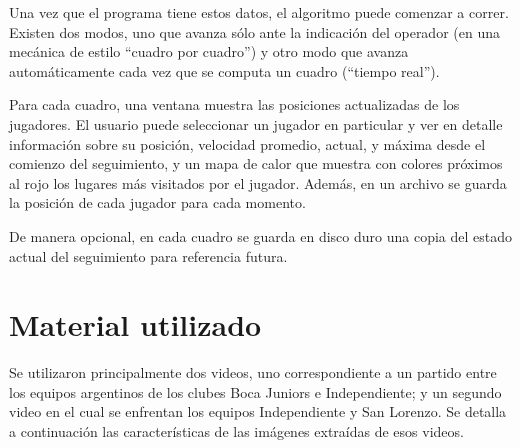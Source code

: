 Una vez que el programa tiene estos datos, el algoritmo puede comenzar a
correr. Existen dos modos, uno que avanza sólo ante la indicación del operador
(en una mecánica de estilo ``cuadro por cuadro'') y otro modo que avanza
automáticamente cada vez que se computa un cuadro (``tiempo real'').

Para cada cuadro, una ventana muestra las posiciones actualizadas de los
jugadores. El usuario puede seleccionar un jugador en particular y ver en
detalle información sobre su posición, velocidad promedio, actual, y máxima
desde el comienzo del seguimiento, y un mapa de calor que muestra con colores
próximos al rojo los lugares más visitados por el jugador. Además, en un
archivo se guarda la posición de cada jugador para cada momento.

De manera opcional, en cada cuadro se guarda en disco duro una copia del estado
actual del seguimiento para referencia futura.

\section{Material utilizado}

Se utilizaron principalmente dos videos, uno correspondiente a un partido entre
los equipos argentinos de los clubes Boca Juniors e Independiente; y un segundo
video en el cual se enfrentan los equipos Independiente y San Lorenzo. Se
detalla a continuación las características de las imágenes extraídas de esos
videos.

